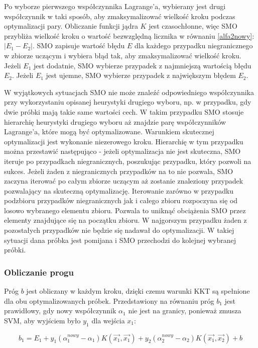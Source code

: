 \documentclass[[10pt,a4paper]{article}
\begin{document}
Po wyborze pierwszego współczynnika Lagrange'a, wybierany jest drugi współczynnik w taki sposób, aby zmaksymalizować wielkość kroku podczas optymalizacji pary. Obliczanie funkcji jądra $K$ jest czasochłonne, więc SMO przybliża wielkość kroku o wartość bezwzględną licznika w równaniu \ref{alfa2nowy}: $|E_1 - E_2|$. SMO zapisuje wartość błędu $E$ dla każdego przypadku niegranicznego w zbiorze uczącym i wybiera błąd tak, aby zmaksymalizować wielkość kroku. Jeżeli $E_1$ jest dodatnie, SMO wybierze przypadek z najmniejszą wartością błędu $E_2$. Jeżeli $E_1$ jest ujemne, SMO wybierze przypadek z największym błędem $E_2$.


W wyjątkowych sytuacjach SMO nie może znaleźć odpowiedniego współczynnika przy wykorzystaniu opisanej heurystyki drugiego wyboru, np. w przypadku, gdy dwie próbki mają takie same wartości cech. W takim przypadku SMO stosuje hierarchię heurystyki drugiego wyboru aż znajdzie parę współczynników Lagrange'a, które mogą być optymalizowane. Warunkiem skutecznej optymalizacji jest wykonanie niezerowego kroku. Hierarchię w tym przypadku można przestawić następująco - jeżeli optymalizacja nie jest skuteczna, SMO iteruje po przypadkach niegranicznych, poszukując przypadku, który pozwoli na sukces. Jeżeli żaden z niegranicznych przypadków na to nie pozwala, SMO zaczyna iterować po całym zbiorze uczącym aż zostanie znaleziony przypadek pozwalający na skuteczną optymalizację. Iterowanie zarówno w przypadku podzbioru przypadków niegranicznych jak i całego zbioru rozpoczyna się od losowo wybranego elementu zbioru. Pozwala to uniknąć obciążenia SMO przez elementy znajdujące się na początku zbioru. W najgorszym przypadku żaden z pozostałych przypadków nie będzie się nadawał do optymalizacji. W takiej sytuacji dana próbka jest pomijana i SMO przechodzi do kolejnej wybranej próbki.


\subsubsection{Obliczanie progu}


Próg $b$ jest obliczany w każdym kroku, dzięki czemu warunki KKT są spełnione dla obu optymalizowanych próbek. Przedstawiony na równaniu próg $b_1$ jest prawidłowy, gdy nowy współczynnik $\alpha_1$ nie jest na granicy, ponieważ zmusza SVM, aby wyjściem było $y_1$ dla wejścia $x_1$:

\begin{equation}
b_1 = E_1 + y_1(\alpha^{nowy}_1 - \alpha_1)K(\overrightarrow{x_1},\overrightarrow{x_1}) + y_2(\alpha^{nowy}_2 - \alpha_2)K(\overrightarrow{x_1},\overrightarrow{x_2}) + b
\end{equation}
\end{document}
